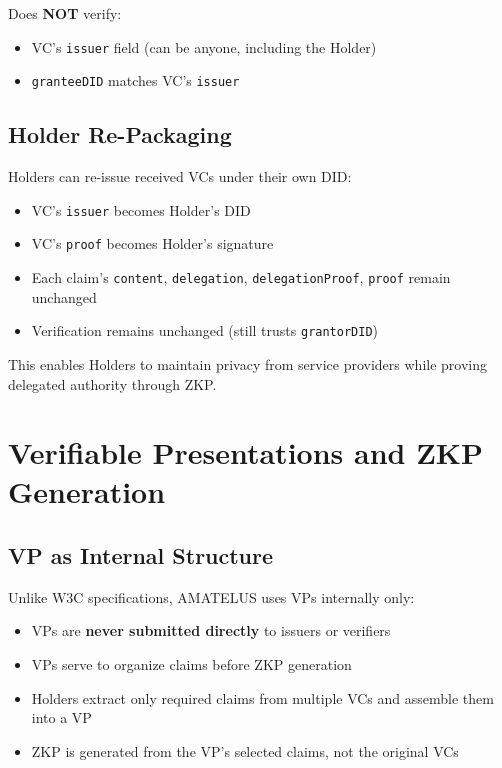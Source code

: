 Does \textbf{NOT} verify:
\begin{itemize}
  \item VC's \texttt{issuer} field (can be anyone, including the Holder)
  \item \texttt{granteeDID} matches VC's \texttt{issuer}
\end{itemize}

\subsection{Holder Re-Packaging}

Holders can re-issue received VCs under their own DID:

\begin{itemize}
  \item VC's \texttt{issuer} becomes Holder's DID
  \item VC's \texttt{proof} becomes Holder's signature
  \item Each claim's \texttt{content}, \texttt{delegation}, \texttt{delegationProof}, \texttt{proof} remain unchanged
  \item Verification remains unchanged (still trusts \texttt{grantorDID})
\end{itemize}

This enables Holders to maintain privacy from service providers while proving delegated authority through ZKP.

\section{Verifiable Presentations and ZKP Generation}

\subsection{VP as Internal Structure}

Unlike W3C specifications, AMATELUS uses VPs internally only:

\begin{itemize}
  \item VPs are \textbf{never submitted directly} to issuers or verifiers
  \item VPs serve to organize claims before ZKP generation
  \item Holders extract only required claims from multiple VCs and assemble them into a VP
  \item ZKP is generated from the VP's selected claims, not the original VCs
\end{itemize}

